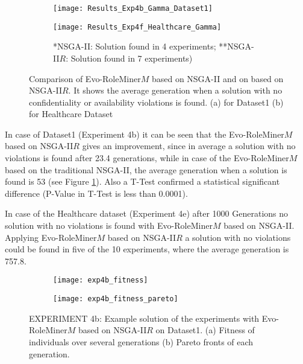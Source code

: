 \begin{figure}[H]
	\centering
	\begin{subfigure}{0.5\textwidth}
		\texttt{[image: Results\_Exp4b\_Gamma\_Dataset1]}
		\caption{}
		\label{fig:Results_Exp4b_Gamma_Dataset1}
	\end{subfigure}%
	\begin{subfigure}{0.5\textwidth}
		\texttt{[image: Results\_Exp4f\_Healthcare\_Gamma]}
		\caption{*NSGA-II: Solution found in 4 experiments; **NSGA-II$R$: Solution found in 7 experiments)}
		\label{fig:Results_Exp4f_Healthcare_Gamma}
	\end{subfigure}
	\caption{Comparison of Evo-RoleMiner$M$ based on NSGA-II and on based on NSGA-II$R$. It shows the average generation when a solution with no confidentiality or availability violations is found. (a) for Dataset1 (b) for Healthcare Dataset}
	\label{fig:Results_Exp4b_f_Gamma}
\end{figure}

In case of Dataset1 (Experiment 4b) it can be seen that the Evo-RoleMiner$M$ based on NSGA-II$R$ gives an improvement, since in average a solution with no violations is found after 23.4 generations, while in case of the Evo-RoleMiner$M$ based on the traditional NSGA-II, the average generation when a solution is found is 53 (see Figure \ref{fig:Results_Exp4b_Gamma_Dataset1}). Also a T-Test confirmed a statistical significant difference (P-Value in T-Test is less than 0.0001).

In case of the Healthcare dataset (Experiment 4e) after 1000 Generations no solution with no violations is found with Evo-RoleMiner$M$ based on NSGA-II. Applying Evo-RoleMiner$M$ based on NSGA-II$R$ a solution with no violations could be found in five of the 10 experiments, where the average generation is 757.8.

\begin{figure}[H]
	\centering
	\begin{subfigure}{\textwidth}
		\centering
		\texttt{[image: exp4b\_fitness]}
		\caption{}
		\label{fig:exp4b_fitness_A}
	\end{subfigure}
	\begin{subfigure}{\textwidth}
		\centering
		\texttt{[image: exp4b\_fitness\_pareto]}
		\caption{}
		\label{fig:exp4b_fitness_B}
	\end{subfigure}
	\caption{EXPERIMENT 4b: Example solution of the experiments with Evo-RoleMiner$M$ based on NSGA-II$R$ on Dataset1. (a) Fitness of individuals over several generations (b) Pareto fronts of each generation.}
	\label{fig:exp4b_fitness}
\end{figure}


